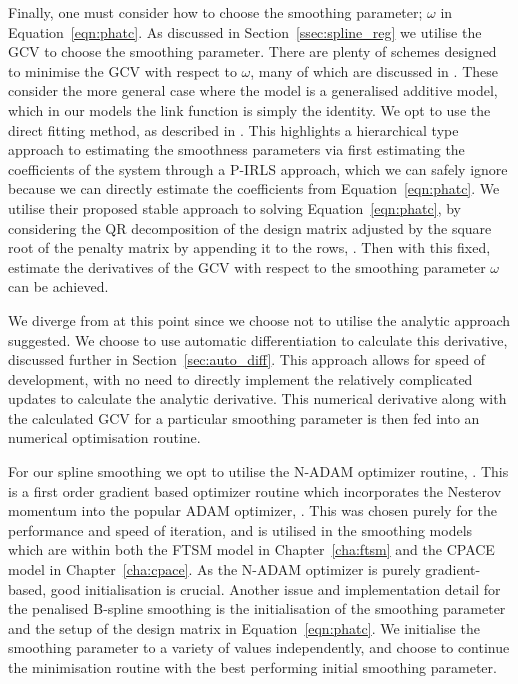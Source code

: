 Finally, one must consider how to choose the smoothing parameter; $\omega$ in Equation~\ref{eqn:phatc}.
As discussed in Section~\ref{ssec:spline_reg} we utilise the GCV to choose the smoothing parameter.
There are plenty of schemes designed to minimise the GCV with respect to $\omega$, many of which are discussed in \citep{wood_fast_2011}.
These consider the more general case where the model is a generalised additive model, which in our models the link function is simply the identity.
We opt to use the direct fitting method, as described in \citep{wood_fast_2008}.
This highlights a hierarchical type approach to estimating the smoothness parameters via first estimating the coefficients of the system through a P-IRLS approach, which we can safely ignore because we can directly estimate the coefficients from Equation~\ref{eqn:phatc}.
We utilise their proposed stable approach to solving Equation~\ref{eqn:phatc}, by considering the QR decomposition of the design matrix adjusted by the square root of the penalty matrix by appending it to the rows, \citep{wood_fast_2008}.
Then with this fixed, estimate the derivatives of the GCV with respect to the smoothing parameter $\omega$ can be achieved.

We diverge from \citep{wood_fast_2008} at this point since we choose not to utilise the analytic approach suggested.
We choose to use automatic differentiation to calculate this derivative, discussed further in Section~\ref{sec:auto_diff}.
This approach allows for speed of development, with no need to directly implement the relatively complicated updates to calculate the analytic derivative.
This numerical derivative along with the calculated GCV for a particular smoothing parameter is then fed into an numerical optimisation routine.

For our spline smoothing we opt to utilise the N-ADAM optimizer routine, \citep{dozat_incorporating_2016}.
This is a first order gradient based optimizer routine which incorporates the Nesterov momentum into the popular ADAM optimizer, \citep{dozat_incorporating_2016}.
This was chosen purely for the performance and speed of iteration, and is utilised in the smoothing models which are within both the FTSM model in Chapter~\ref{cha:ftsm} and the CPACE model in Chapter~\ref{cha:cpace}.
As the N-ADAM optimizer is purely gradient-based, good initialisation is crucial.
Another issue and implementation detail for the penalised B-spline smoothing is the initialisation of the smoothing parameter and the setup of the design matrix in Equation~\ref{eqn:phatc}.
We initialise the smoothing parameter to a variety of values independently, and choose to continue the minimisation routine with the best performing initial smoothing parameter.


